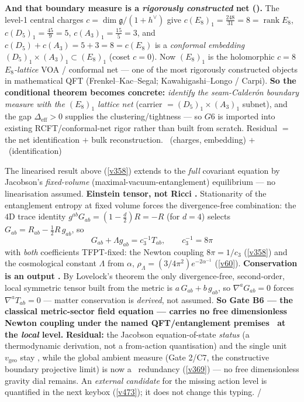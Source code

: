 \documentclass[11pt,a4paper]{article}
\newcommand{\cthree}{c_3}
\begin{document}
\begin{keybox}
\smallskip\noindent\textbf{And that boundary measure is a \emph{rigorously constructed} net ().}
The level-1 central charges $c=\dim\mathfrak g/(1+h^\vee)$ give $c(E_8)_1=\tfrac{248}{31}=8=\operatorname{rank}E_8$,
$c(D_5)_1=\tfrac{45}{9}=5$, $c(A_3)_1=\tfrac{15}{5}=3$, and $c(D_5){+}c(A_3)=5{+}3=8=c(E_8)$ is a \emph{conformal
embedding} $(D_5)_1\!\times\!(A_3)_1\subset(E_8)_1$ (coset $c=0$). Now $(E_8)_1$ is the holomorphic $c=8$
\emph{$E_8$-lattice} VOA / conformal net --- one of the most rigorously constructed objects in mathematical QFT
(Frenkel--Kac--Segal; Kawahigashi--Longo / Carpi). \textbf{So the conditional theorem becomes concrete:}
\emph{identify the seam-Calder\'on boundary measure with the $(E_8)_1$ lattice net} (carrier $=(D_5)_1\!\times\!(A_3)_1$
subnet), and the gap $\Delta_{\mathrm{eff}}>0$ supplies the clustering/tightness --- so $G6$ is imported into
existing RCFT/conformal-net rigor rather than built from scratch. Residual $=$ the net identification $+$ bulk
reconstruction. \mE\ (charges, embedding) $+$ \mC\ (identification)
\end{keybox}

\begin{keybox}
The linearised result above (\vref{v358}) extends to the \emph{full} covariant equation by Jacobson's
\emph{fixed-volume} (maximal-vacuum-entanglement) equilibrium --- no linearisation assumed.
\textbf{Einstein tensor, not Ricci \mE.} Stationarity of the entanglement entropy at fixed volume forces the
divergence-free combination: the $4$D trace identity $g^{ab}G_{ab}=(1-\tfrac d2)R=-R$ (for $d=4$) selects
$G_{ab}=R_{ab}-\tfrac12 R\,g_{ab}$, so
\[
  \boxed{\ G_{ab}+\Lambda g_{ab}=\cthree^{-1}T_{ab},\qquad \cthree^{-1}=8\pi\ }
\]
with \emph{both} coefficients TFPT-fixed: the Newton coupling $8\pi=1/\cthree$ (\vref{v358}) and the
cosmological constant $\Lambda$ from $\alpha$, $\rho_\Lambda=(3/4\pi^2)e^{-2\alpha^{-1}}$ (\vref{v60}).
\textbf{Conservation is an output \mE.} By Lovelock's theorem the only divergence-free, second-order, local
symmetric tensor built from the metric is $a\,G_{ab}+b\,g_{ab}$, so $\nabla^a G_{ab}=0$ forces
$\nabla^a T_{ab}=0$ --- matter conservation is \emph{derived}, not assumed. \textbf{So Gate B6 --- the
classical metric-sector field equation --- carries no free dimensionless Newton coupling under the named QFT/entanglement premises \mC\ at the \emph{local} level.}
\textbf{Residual:} the Jacobson equation-of-state \emph{status} (a thermodynamic derivation, not a
from-action quantisation) and the single unit $v_{\mathrm{geo}}$ stay \mO, while the global ambient measure
(Gate 2/C7, the constructive boundary projective limit) is now a \mC\ redundancy (\vref{v369}) --- no free
dimensionless gravity dial remains. An \emph{external candidate} for the missing action level is quantified
in the next keybox (\vref{v473}); it does not change this typing. \mE/\mC
\end{keybox}
\end{document}

